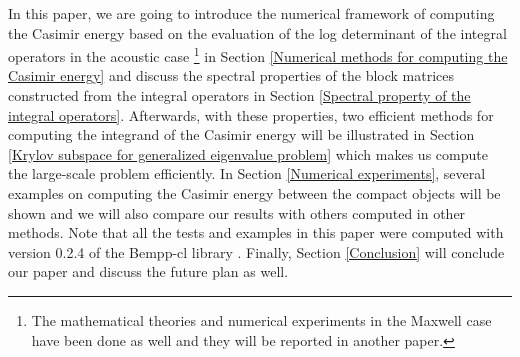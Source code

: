 In this paper, we are going to introduce the numerical framework of computing the Casimir energy based on the evaluation of the log determinant of the integral 
operators in the acoustic case \footnote{The mathematical theories and numerical experiments in the Maxwell case have been done as well and they will be 
reported in another paper.} in Section \ref{Numerical methods for computing the Casimir energy} and discuss the spectral properties 
of the block matrices constructed from the integral operators in Section \ref{Spectral property of the integral operators}. Afterwards, with these properties, 
two efficient methods for computing the integrand of the Casimir energy will be illustrated in Section \ref{Krylov subspace for generalized eigenvalue problem}
which makes us compute the large-scale problem efficiently. In Section \ref{Numerical experiments}, several examples on computing the Casimir energy between 
the compact objects will be shown and we will also compare our results with others computed in other methods. Note that all the tests and examples in this paper were computed 
with version 0.2.4 of the Bempp-cl library \cite{scroggs2017software}. Finally, Section \ref{Conclusion} will conclude 
our paper and discuss the future plan as well.